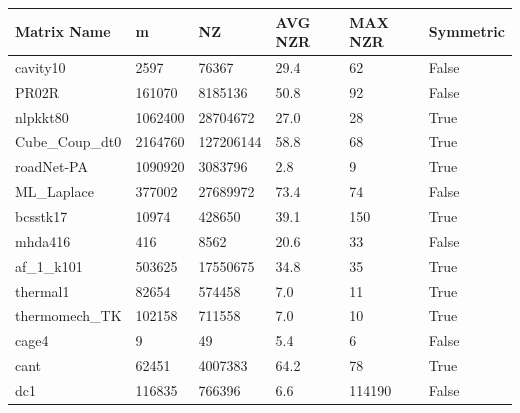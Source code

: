 \documentclass[12pt,oneside]{book} %
\begin{document}
\begin{table}[h]
    \centering
    \begin{tabular}{|l|l|l|l|l|l|}
        \hline
        \textbf{Matrix Name} & \textbf{m} & \textbf{NZ} & \textbf{AVG NZR} & \textbf{MAX NZR} & \textbf{Symmetric} \\ \hline
        cavity10             & 2597       & 76367       & 29.4             & 62               & False              \\ \hline
        PR02R                & 161070     & 8185136     & 50.8             & 92               & False              \\ \hline
        nlpkkt80             & 1062400    & 28704672    & 27.0             & 28               & True               \\ \hline
        Cube\_Coup\_dt0      & 2164760    & 127206144   & 58.8             & 68               & True               \\ \hline
        roadNet-PA           & 1090920    & 3083796     & 2.8              & 9                & True               \\ \hline
        ML\_Laplace          & 377002     & 27689972    & 73.4             & 74               & False              \\ \hline
        bcsstk17             & 10974      & 428650      & 39.1             & 150              & True               \\ \hline
        mhda416              & 416        & 8562        & 20.6             & 33               & False              \\ \hline
        af\_1\_k101          & 503625     & 17550675    & 34.8             & 35               & True               \\ \hline
        thermal1             & 82654      & 574458      & 7.0              & 11               & True               \\ \hline
        thermomech\_TK       & 102158     & 711558      & 7.0              & 10               & True               \\ \hline
        cage4                & 9          & 49          & 5.4              & 6                & False              \\ \hline
        cant                 & 62451      & 4007383     & 64.2             & 78               & True               \\ \hline
        dc1                  & 116835     & 766396      & 6.6              & 114190           & False              \\ \hline

\end{tabular}
\end{table}
\end{document}
